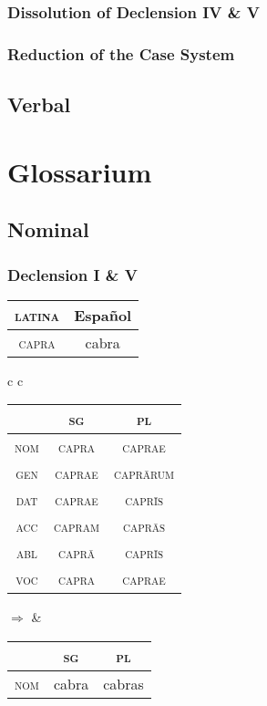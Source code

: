 \documentclass{report}
\begin{document}
\subsection{Dissolution of Declension IV \& V}

\subsection{Reduction of the Case System}

\section{Verbal}

\chapter{Glossarium}

\section{Nominal}

\subsection{Declension I \& V}

\begin{tabular}{|c|c|}
  \hline
  \textsc{latina} & Español \\
  \hline
  \textsc{capra} & cabra \\
  \hline
\end{tabular}

\begin{tabular}{c c}
  \begin{tabular}{|c|c|c|}
    \hline
    & \textsc{sg} & \textsc{pl} \\
    \hline
    \textsc{nom} & \textsc{capra }& \textsc{caprae} \\
    \hline
    \textsc{gen} & \textsc{caprae} & \textsc{capr\={a}rum} \\
    \hline
    \textsc{dat} & \textsc{caprae} & \textsc{capr\={i}s} \\
    \hline
    \textsc{acc} & \cellcolor{gray} \textsc{capram} & \cellcolor{magenta} \textsc{capr\={a}s} \\
    \hline
    \textsc{abl} & \textsc{capr\={a}} & \textsc{capr\={i}s} \\
    \hline
    \textsc{voc} & \textsc{capra} & \textsc{caprae} \\
    \hline
  \end{tabular} \quad $\Rightarrow$ &

  \begin{tabular}{|c|c|c|}
    \hline
    & \textsc{sg} & \textsc{pl} \\
    \hline
    \textsc{nom} & \cellcolor{gray} cabra & \cellcolor{magenta} cabras \\
    \hline
  \end{tabular} \\
\end{tabular}
\end{document}
